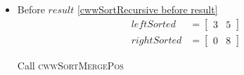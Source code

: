\begin{frame}[containsverbatim]{\cwwalgortihmexampleframe}
\begin{columns}[c]
\begin{column}{0.65\textwidth}
\begin{itemize}
                            \item Before $result$ \cref{cwwSortRecursive before result}
                            \begin{align*}
                                leftSorted & = \begin{bmatrix}3 & 5\end{bmatrix} \\
                                rightSorted & = \begin{bmatrix}0 & 8\end{bmatrix}
                            \end{align*}

                            Call \textsc{cwwSortMergePos}
                        \end{itemize}
                \end{column}
            \end{columns}
        \end{frame}

